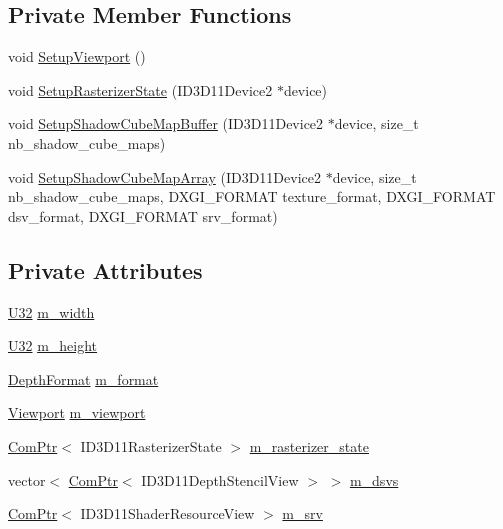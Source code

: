 \subsection*{Private Member Functions}
\begin{DoxyCompactItemize}
\item 
void \hyperlink{structmage_1_1_shadow_cube_map_buffer_a612f25e151e575a7266b41ddb6a072cf}{Setup\+Viewport} ()
\item 
void \hyperlink{structmage_1_1_shadow_cube_map_buffer_af4cb16c81f8a1fdeb0647dda0e7bc258}{Setup\+Rasterizer\+State} (I\+D3\+D11\+Device2 $\ast$device)
\item 
void \hyperlink{structmage_1_1_shadow_cube_map_buffer_acbdfc3eaf61ba5b4638033b804f90e86}{Setup\+Shadow\+Cube\+Map\+Buffer} (I\+D3\+D11\+Device2 $\ast$device, size\+\_\+t nb\+\_\+shadow\+\_\+cube\+\_\+maps)
\item 
void \hyperlink{structmage_1_1_shadow_cube_map_buffer_a583020f593e4a02f6eda0103f56042bd}{Setup\+Shadow\+Cube\+Map\+Array} (I\+D3\+D11\+Device2 $\ast$device, size\+\_\+t nb\+\_\+shadow\+\_\+cube\+\_\+maps, D\+X\+G\+I\+\_\+\+F\+O\+R\+M\+AT texture\+\_\+format, D\+X\+G\+I\+\_\+\+F\+O\+R\+M\+AT dsv\+\_\+format, D\+X\+G\+I\+\_\+\+F\+O\+R\+M\+AT srv\+\_\+format)
\end{DoxyCompactItemize}
\subsection*{Private Attributes}
\begin{DoxyCompactItemize}
\item 
\hyperlink{namespacemage_a41c104c036fba3756a74e19f793eeaa1}{U32} \hyperlink{structmage_1_1_shadow_cube_map_buffer_a9492f3ff2146a03d30f3f02fd7985aba}{m\+\_\+width}
\item 
\hyperlink{namespacemage_a41c104c036fba3756a74e19f793eeaa1}{U32} \hyperlink{structmage_1_1_shadow_cube_map_buffer_ac20a53ecc1ec9a00a2241f8c8a3405e6}{m\+\_\+height}
\item 
\hyperlink{namespacemage_aed4c3f883a30484d0a20762c06be81d4}{Depth\+Format} \hyperlink{structmage_1_1_shadow_cube_map_buffer_ada9a7c895a74303904f9884b986c935f}{m\+\_\+format}
\item 
\hyperlink{structmage_1_1_viewport}{Viewport} \hyperlink{structmage_1_1_shadow_cube_map_buffer_aac92648e1af47ffdf99575cdaab0485e}{m\+\_\+viewport}
\item 
\hyperlink{namespacemage_ae74f374780900893caa5555d1031fd79}{Com\+Ptr}$<$ I\+D3\+D11\+Rasterizer\+State $>$ \hyperlink{structmage_1_1_shadow_cube_map_buffer_a72ffa7fc89386a954b33fac38a894f2c}{m\+\_\+rasterizer\+\_\+state}
\item 
vector$<$ \hyperlink{namespacemage_ae74f374780900893caa5555d1031fd79}{Com\+Ptr}$<$ I\+D3\+D11\+Depth\+Stencil\+View $>$ $>$ \hyperlink{structmage_1_1_shadow_cube_map_buffer_aa0db6bec24d63c39c85400c4328190fc}{m\+\_\+dsvs}
\item 
\hyperlink{namespacemage_ae74f374780900893caa5555d1031fd79}{Com\+Ptr}$<$ I\+D3\+D11\+Shader\+Resource\+View $>$ \hyperlink{structmage_1_1_shadow_cube_map_buffer_a16738a534aca6de39aec687bc79ede1c}{m\+\_\+srv}
\end{DoxyCompactItemize}


